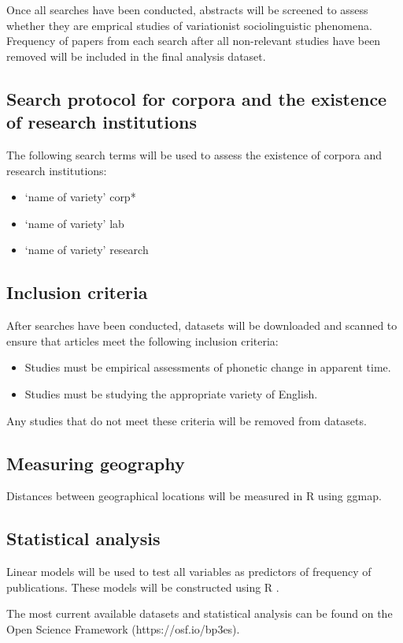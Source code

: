 \documentclass[review]{article}
\begin{document}
Once all searches have been conducted, abstracts will be screened to assess whether they are emprical studies of variationist sociolinguistic phenomena. Frequency of papers  from each search after all non-relevant studies have been removed will be included in the final analysis dataset. 


\subsection{Search protocol for corpora and the existence of research institutions}

The following search terms will be used to assess the existence of corpora and research institutions:

\begin{itemize}
\item `name of variety' corp*
\item `name of variety' lab
\item `name of variety' research
\end{itemize}

\subsection{Inclusion criteria}

After searches have been conducted, datasets will be downloaded and scanned to ensure that articles meet the following inclusion criteria:

\begin{itemize}
	\item Studies must be empirical assessments of phonetic change in apparent time.
	\item Studies must be studying the appropriate variety of English.
\end{itemize}

Any studies that do not meet these criteria will be removed from datasets.


\subsection{Measuring geography}

Distances between geographical locations will be measured in R using ggmap.



\subsection{Statistical analysis}
Linear models will be used to test all variables as predictors of frequency of publications. These models will be constructed using R \cite{R2018}.

The most current available datasets and statistical analysis can be found on the Open Science Framework (https://osf.io/bp3es). 




\end{document}
